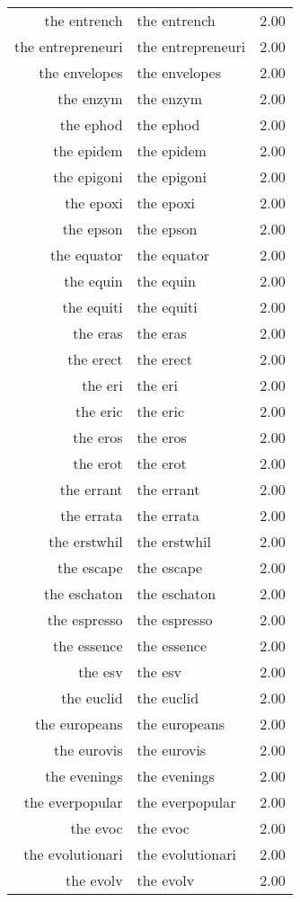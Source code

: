 \begin{table}[ht]
\begin{tabular}{rlr}
  the entrench & the entrench & 2.00 \\ 
  the entrepreneuri & the entrepreneuri & 2.00 \\ 
  the envelopes & the envelopes & 2.00 \\ 
  the enzym & the enzym & 2.00 \\ 
  the ephod & the ephod & 2.00 \\ 
  the epidem & the epidem & 2.00 \\ 
  the epigoni & the epigoni & 2.00 \\ 
  the epoxi & the epoxi & 2.00 \\ 
  the epson & the epson & 2.00 \\ 
  the equator & the equator & 2.00 \\ 
  the equin & the equin & 2.00 \\ 
  the equiti & the equiti & 2.00 \\ 
  the eras & the eras & 2.00 \\ 
  the erect & the erect & 2.00 \\ 
  the eri & the eri & 2.00 \\ 
  the eric & the eric & 2.00 \\ 
  the eros & the eros & 2.00 \\ 
  the erot & the erot & 2.00 \\ 
  the errant & the errant & 2.00 \\ 
  the errata & the errata & 2.00 \\ 
  the erstwhil & the erstwhil & 2.00 \\ 
  the escape & the escape & 2.00 \\ 
  the eschaton & the eschaton & 2.00 \\ 
  the espresso & the espresso & 2.00 \\ 
  the essence & the essence & 2.00 \\ 
  the esv & the esv & 2.00 \\ 
  the euclid & the euclid & 2.00 \\ 
  the europeans & the europeans & 2.00 \\ 
  the eurovis & the eurovis & 2.00 \\ 
  the evenings & the evenings & 2.00 \\ 
  the everpopular & the everpopular & 2.00 \\ 
  the evoc & the evoc & 2.00 \\ 
  the evolutionari & the evolutionari & 2.00 \\ 
  the evolv & the evolv & 2.00 \\ 

\end{tabular}
\end{table}
